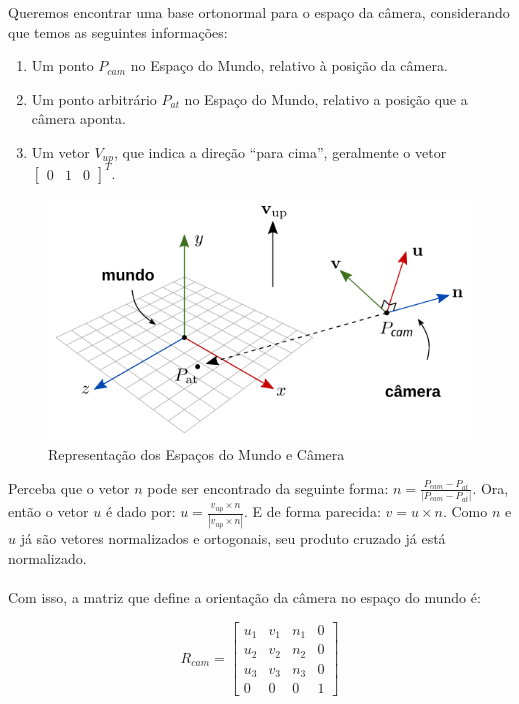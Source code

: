 \documentclass[12pt]{article}
\begin{document}
\boldmath{}
Queremos encontrar uma base ortonormal  para o espaço da câmera, considerando que temos as seguintes informações:

\begin{enumerate}[noitemsep]
    \item Um ponto $P_{cam}$ no Espaço do Mundo, relativo à posição da câmera.
    \item Um ponto arbitrário $P_{at}$ no Espaço do Mundo, relativo a posição que a câmera aponta.
    \item Um vetor $V_{up}$, que indica a direção ``para cima'', geralmente  o vetor $\begin{bmatrix}
        0 & 1 & 0
    \end{bmatrix}^T$. 
\end{enumerate}

\begin{figure}[H]
    \centering
    \includegraphics[width=0.6\linewidth]{imgs/07_lookat1.png}
    \caption{Representação dos Espaços do Mundo e Câmera}
\end{figure}

\noindent
Perceba que o vetor $n$ pode ser encontrado da seguinte forma: $n =\frac{P_{cam}-P_{at}}{|P_{cam}-P_{at}|}$.
Ora, então o vetor $u$ é dado por: $u =\frac{v_{up} \times n}{|v_{up} \times n|}$. E de forma parecida: $v = u \times n$. Como $n$ e $u$ já são vetores normalizados e ortogonais, seu produto cruzado já está normalizado.
\\~\\
Com isso, a matriz que define a orientação da câmera no espaço do mundo é:

\unboldmath{}

\[
R_{cam} =
\begin{bmatrix}
    u_1 & v_1 & n_1 & 0   \\
    u_2 & v_2 & n_2 & 0   \\    
    u_3 & v_3 & n_3 & 0   \\
    0 & 0 & 0 & 1
\end{bmatrix}
\]
\end{document}
